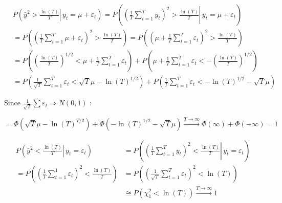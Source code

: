 {{\begin{enumerate}[label=(\alph*)]
{\item 
$$
\begin{aligned}
& P\left(\left.\bar{y}^{2}>\frac{\ln (T)}{T} \right\rvert\, y_{t}=\mu+\varepsilon_{t}\right)=P\left(\left.\left(\frac{1}{T} \sum_{t=1}^{T} y_{t}\right)^{2}>\frac{\ln (T)}{T} \right\rvert\, y_{t}=\mu+\varepsilon_{t}\right) \\
&=P\left(\left(\frac{1}{T} \sum_{t=1}^{T} \mu+\varepsilon_{t}\right)^{2}>\frac{\ln (T)}{T}\right)=P\left(\left(\mu+\frac{1}{T} \sum_{t=1}^{T} \varepsilon_{t}\right)^{2}>\frac{\ln (T)}{T}\right) \\
&=P\left(\left(\frac{\ln (T)}{T}\right)^{1 / 2}<\mu+\frac{1}{T} \sum_{t=1}^{T} \varepsilon_{t}\right)+P\left(\mu+\frac{1}{T} \sum_{t=1}^{T} \varepsilon_{t}<-\left(\frac{\ln (T)}{T}\right)^{1 / 2}\right) \\
&=P\left(\frac{1}{\sqrt{T}} \sum_{t=1}^{T} \varepsilon_{t}<\sqrt{T} \mu-\ln (T)^{1 / 2}\right)+P\left(\frac{1}{T} \sum_{t=1}^{T} \varepsilon_{t}<-\ln (T)^{1 / 2}-\sqrt{T} \mu\right)
\end{aligned}
$$

Since $\frac{1}{\sqrt{T}} \sum \varepsilon_{t} \Rightarrow N(0,1)$ :

$$
=\Phi\left(\sqrt{T} \mu-\ln (T)^{T / 2}\right)+\Phi\left(-\ln (T)^{1 / 2}-\sqrt{T} \mu\right) \xrightarrow{T \rightarrow \infty} \Phi(\infty)+\Phi(-\infty)=1
$$
}
{\item 
$$
\begin{aligned}
P\left(\left.\bar{y}^{2}<\frac{\ln (T)}{T} \right\rvert\, y_{t}=\varepsilon_{t}\right)&=P\left(\left.\left(\frac{1}{T} \sum_{t=1}^{T} y_{t}\right)^{2}<\frac{\ln (T)}{T} \right\rvert\, y_{t}=\varepsilon_{t}\right) \\
=P\left(\left(\frac{1}{T} \sum_{t=1}^{1} \varepsilon_{t}\right)^{2}<\frac{\ln (T)}{T}\right)&=P\left(\left(\frac{1}{\sqrt{T}} \sum_{t=1}^{T} \varepsilon_{t}\right)^{2}<\ln (T)\right) \\
&\cong P\left(\chi_{1}^{2}<\ln (T)\right) \xrightarrow{T \rightarrow \infty} 1
\end{aligned}
$$
}
\end{enumerate}
}
}

